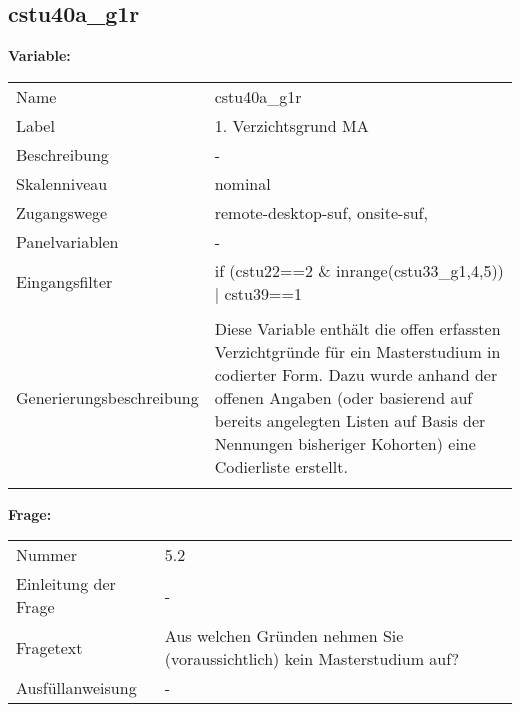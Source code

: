 	
	
	\subsection{cstu40a\_g1r}
	\label{subSection:cstu40a_g1r}

	\noindent\textbf{Variable:}\\
		\begin{tabular}{lL{11.3cm}}
			\label{tableVariable:cstu40a_g1r}
			Name & cstu40a\_g1r \\
			Label & 1. Verzichtsgrund MA \\
			Beschreibung & - \\
			Skalenniveau & nominal \\
			Zugangswege &
				remote-desktop-suf,
				onsite-suf,
 \\
			Panelvariablen & -
			 \\
			Eingangsfilter & if (cstu22==2 \& inrange(cstu33\_g1,4,5)) | cstu39==1 \\
 \\
					Generierungsbeschreibung & Diese Variable enthält die offen erfassten Verzichtgründe für ein Masterstudium in codierter Form. Dazu wurde anhand der offenen Angaben (oder basierend auf bereits angelegten Listen auf Basis der Nennungen bisheriger Kohorten) eine Codierliste erstellt.
				 \\	
			 \\
		\end{tabular}

		\vspace*{1 cm}
		\noindent\textbf{Frage:}\\
		\begin{tabular}{lL{11.3cm}}
			\label{tableQuestion:cstu40a_g1r}
			Nummer & 5.2 \\
			Einleitung der Frage & - \\
			Fragetext & Aus welchen Gründen nehmen Sie (voraussichtlich) kein Masterstudium auf? \\
			Ausfüllanweisung & - \\
		\end{tabular}





